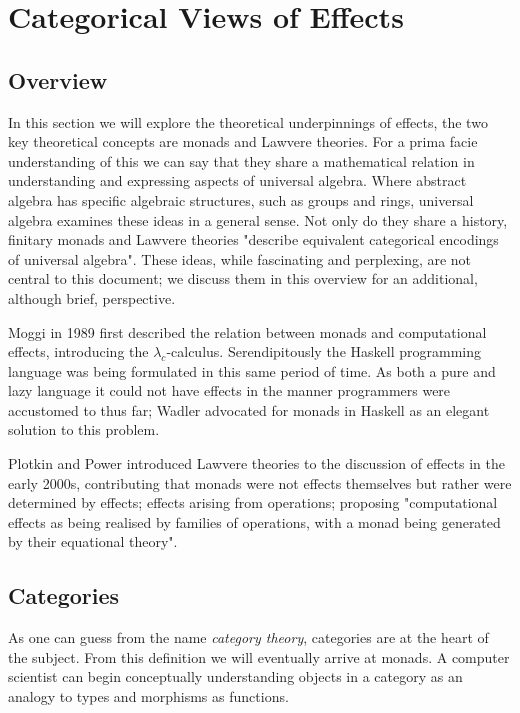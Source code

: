 \section{Categorical Views of Effects}

\subsection{Overview}
In this section we will explore the theoretical underpinnings of effects,
the two key theoretical concepts are monads and Lawvere theories.
For a prima facie understanding of this we can say that
they share a mathematical relation in understanding and expressing aspects of universal algebra.
Where abstract algebra has specific algebraic structures, such as groups and rings,
universal algebra examines these ideas in a general sense.
Not only do they share a history, finitary monads and Lawvere theories
"describe equivalent categorical encodings of universal algebra"\cite{riehl}.
These ideas, while fascinating and perplexing,
are not central to this document;
we discuss them in this overview for an additional,
although brief, perspective.

Moggi in 1989 \cite{moggi1989computational}
first described the relation between monads and computational effects,
introducing the $\lambda_c$-calculus.
Serendipitously the Haskell programming language\cite{hudak1992report}
was being formulated in this same period of time.
As both a pure and lazy language
it could not have effects in the manner programmers were accustomed to thus far;
Wadler\cite{wadler1990} advocated for monads in Haskell as an elegant
solution to this problem.

Plotkin and Power \cite{Plotkin:2001jr}
introduced Lawvere theories to the discussion of effects
in the early 2000s,
contributing that monads were not effects themselves but rather were determined by effects;
effects arising from operations; proposing "computational effects as being realised by
families of operations, with a monad being generated by their equational theory"\cite{Plotkin:2002dw}.

\subsection{Categories}
As one can guess from the name \textit{category theory},
categories are at the heart of the subject.
From this definition we will eventually arrive at monads.
A computer scientist can begin conceptually
understanding objects in a category
as an analogy to types
and morphisms as functions.\\

